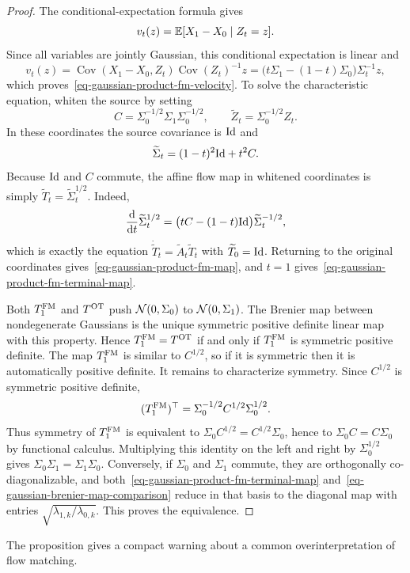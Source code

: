 \begin{proof}
	The conditional-expectation formula gives
	\[
		v_t(z)=\mathbb{E}[X_1-X_0\mid Z_t=z].
	\]
	Since all variables are jointly Gaussian, this conditional expectation is linear and
	\[
		v_t(z)
		=
		\operatorname{Cov}(X_1-X_0,Z_t)\operatorname{Cov}(Z_t)^{-1}z
		=
		\bigl(t\Sigma_1-(1-t)\Sigma_0\bigr)\Sigma_t^{-1}z,
	\]
	which proves~\eqref{eq-gaussian-product-fm-velocity}. To solve the characteristic equation, whiten the source by setting
	\[
		C=\Sigma_0^{-1/2}\Sigma_1\Sigma_0^{-1/2},
		\qquad
		\widetilde Z_t=\Sigma_0^{-1/2}Z_t.
	\]
	In these coordinates the source covariance is $\mathrm{Id}$ and
	\[
		\widetilde\Sigma_t=(1-t)^2\mathrm{Id}+t^2C.
	\]
	Because $\mathrm{Id}$ and $C$ commute, the affine flow map in whitened coordinates is simply $\widetilde T_t=\widetilde\Sigma_t^{1/2}$. Indeed,
	\[
		\frac{\mathrm{d}}{\mathrm{d} t}\widetilde\Sigma_t^{1/2}
		=
		\bigl(tC-(1-t)\mathrm{Id}\bigr)\widetilde\Sigma_t^{-1/2},
	\]
	which is exactly the equation $\dot{\widetilde T}_t=\widetilde A_t\widetilde T_t$ with $\widetilde T_0=\mathrm{Id}$. Returning to the original coordinates gives~\eqref{eq-gaussian-product-fm-map}, and $t=1$ gives~\eqref{eq-gaussian-product-fm-terminal-map}.

	Both $T_1^{\rm FM}$ and $T^{\rm OT}$ push $\mathcal{N}(0,\Sigma_0)$ to $\mathcal{N}(0,\Sigma_1)$. The Brenier map between nondegenerate Gaussians is the unique symmetric positive definite linear map with this property. Hence $T_1^{\rm FM}=T^{\rm OT}$ if and only if $T_1^{\rm FM}$ is symmetric positive definite. The map $T_1^{\rm FM}$ is similar to $C^{1/2}$, so if it is symmetric then it is automatically positive definite. It remains to characterize symmetry. Since $C^{1/2}$ is symmetric positive definite,
	\[
		(T_1^{\rm FM})^\top
		=
		\Sigma_0^{-1/2}C^{1/2}\Sigma_0^{1/2}.
	\]
	Thus symmetry of $T_1^{\rm FM}$ is equivalent to
	$\Sigma_0 C^{1/2}=C^{1/2}\Sigma_0$, hence to $\Sigma_0 C=C\Sigma_0$ by functional calculus. Multiplying this identity on the left and right by $\Sigma_0^{1/2}$ gives $\Sigma_0\Sigma_1=\Sigma_1\Sigma_0$. Conversely, if $\Sigma_0$ and $\Sigma_1$ commute, they are orthogonally co-diagonalizable, and both~\eqref{eq-gaussian-product-fm-terminal-map} and~\eqref{eq-gaussian-brenier-map-comparison} reduce in that basis to the diagonal map with entries $\sqrt{\lambda_{1,k}/\lambda_{0,k}}$. This proves the equivalence.
\end{proof}

The proposition gives a compact warning about a common overinterpretation of flow matching.

